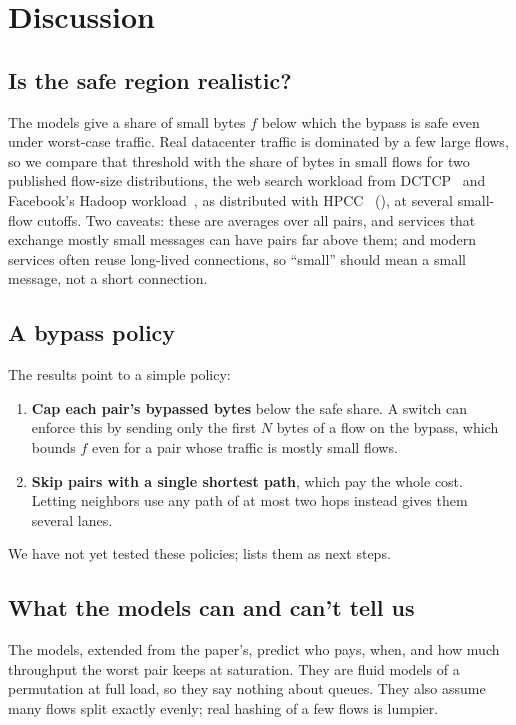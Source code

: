 \section{Discussion}
\label{sec:discussion}

\subsection{Is the safe region realistic?}

The models give a share of small bytes $f$ below which the bypass is safe even under worst-case traffic. Real datacenter traffic is dominated by a few large flows, so we compare that threshold with the share of bytes in small flows for two published flow-size distributions, the web search workload from DCTCP~\cite{dctcp} and Facebook's Hadoop workload~\cite{fbdc}, as distributed with HPCC~\cite{hpcc} (), at several small-flow cutoffs. Two caveats: these are averages over all pairs, and services that exchange mostly small messages can have pairs far above them; and modern services often reuse long-lived connections, so ``small'' should mean a small message, not a short connection.

\subsection{A bypass policy}

The results point to a simple policy:
\begin{enumerate}
  \item \textbf{Cap each pair's bypassed bytes} below the safe share. A switch can enforce this by sending only the first $N$ bytes of a flow on the bypass, which bounds $f$ even for a pair whose traffic is mostly small flows.
  \item \textbf{Skip pairs with a single shortest path}, which pay the whole cost. Letting neighbors use any path of at most two hops instead gives them several lanes.
\end{enumerate}
We have not yet tested these policies;  lists them as next steps.

\subsection{What the models can and can't tell us}

The models, extended from the paper's, predict who pays, when, and how much throughput the worst pair keeps at saturation. They are fluid models of a permutation at full load, so they say nothing about queues. They also assume many flows split exactly evenly; real hashing of a few flows is lumpier.
